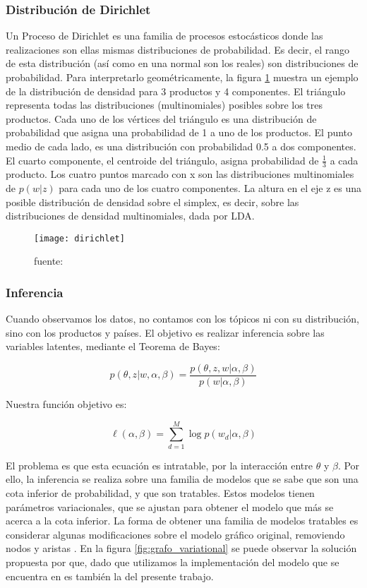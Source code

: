\documentclass[class=article, crop=false]{standalone}
\begin{document}
\subsubsection{Distribución de Dirichlet}

Un Proceso de Dirichlet es una familia de procesos estocásticos donde las realizaciones son ellas mismas distribuciones de probabilidad. Es decir, el rango de esta distribución (así como en una normal son los reales) son distribuciones de probabilidad. Para interpretarlo geométricamente, la figura \ref{fig:dirichlet} muestra un ejemplo de la distribución de densidad para 3 productos y 4 componentes. El triángulo representa todas las distribuciones (multinomiales)
posibles sobre los tres productos. Cada uno de los vértices del triángulo es una distribución de probabilidad que asigna una probabilidad de 1 a uno de los productos. El punto medio de cada lado, es una distribución con probabilidad 0.5 a dos componentes. El cuarto componente, el centroide del triángulo, asigna probabilidad de $\frac{1}{3}$ a cada producto. Los cuatro puntos marcado con x son las distribuciones multinomiales de $p(w|z)$  para cada uno de los cuatro componentes. La altura en el eje z es una posible distribución de densidad sobre el
simplex, es decir, sobre las distribuciones de densidad multinomiales, dada por LDA.

\begin{figure}
	\centering	
	\texttt{[image: dirichlet]}
	\caption{fuente: \cite{blei2003latent}}
	\label{fig:dirichlet}
\end{figure}




\subsubsection{Inferencia}

Cuando observamos los datos, no contamos con los tópicos ni con su
distribución, sino con los productos y países. El objetivo es realizar
inferencia sobre las variables latentes, mediante el Teorema de Bayes:

$$
p(\theta,z|w,\alpha,\beta) = \frac{p(\theta,z,w|\alpha,\beta)}{p(w|\alpha,\beta)}
$$

Nuestra función objetivo es:

$$
\ell(\alpha, \beta) = \sum_{d=1}^M \log p(w_d|\alpha,\beta)
$$

El problema es que esta ecuación es intratable, por la interacción entre $\theta$ y $\beta$. Por ello, la inferencia se realiza sobre una familia de modelos que se sabe que son una cota inferior de probabilidad, y que son tratables. Estos modelos tienen parámetros variacionales, que se ajustan para obtener el modelo que más se acerca a la cota inferior. La forma de obtener una familia de modelos tratables es considerar algunas modificaciones sobre el modelo gráfico original, removiendo nodos y aristas \citep{hoffman2013stochastic}. En la figura \ref{fig:grafo_variational} se puede observar la solución propuesta por \citep{blei2003latent} que, dado que utilizamos la implementación del modelo que se encuentra en \cite{scikit-learn} es también la del presente trabajo.
\end{document}
